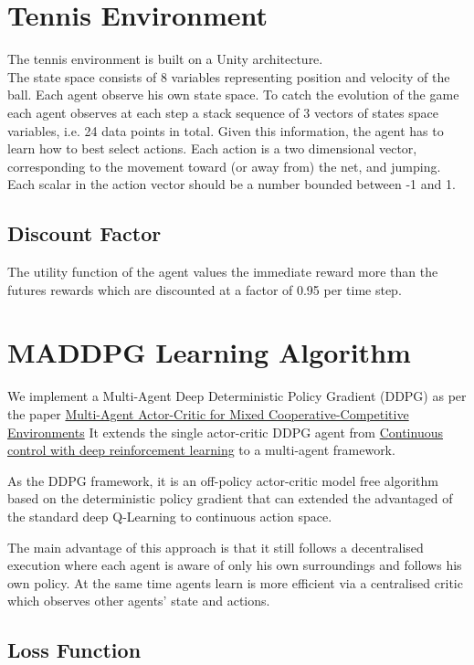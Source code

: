 \documentclass[pagenumber=off]{article}
\begin{document}
\section{Tennis Environment}
The tennis environment is built on a Unity architecture.\\
The state space consists of 8 variables representing position and velocity of the ball. Each agent observe his own state space.
To catch the evolution of the game each agent observes at each step a stack sequence of 3 vectors of states space variables, i.e. 24 data points in total.
Given this information, the agent has to learn how to best select actions. Each action is a two dimensional vector, corresponding to the movement toward (or away from) the net, and jumping. Each scalar in the action vector should be a number bounded between -1 and 1.

\subsection{Discount Factor}
The utility function of the agent values the immediate reward more than the futures rewards which are discounted at a factor of 0.95 per time step.


\section{MADDPG Learning Algorithm}
We implement a Multi-Agent Deep Deterministic Policy Gradient (DDPG) as per the paper \href{https://arxiv.org/pdf/1706.02275}{Multi-Agent Actor-Critic for Mixed Cooperative-Competitive Environments}
It extends the single actor-critic DDPG agent from \href{https://arxiv.org/abs/1509.02971}{Continuous control with deep reinforcement learning} to a multi-agent framework.

As the DDPG framework, it is an off-policy actor-critic model free algorithm based on the deterministic policy gradient that can extended the advantaged of the standard deep Q-Learning to continuous action space.

The main advantage of this approach is that it still follows a decentralised execution where each agent is aware of only his own surroundings and follows his own policy. At the same time agents learn is more efficient via a centralised critic which observes other agents' state and actions.



\subsection{Loss Function}
\end{document}
